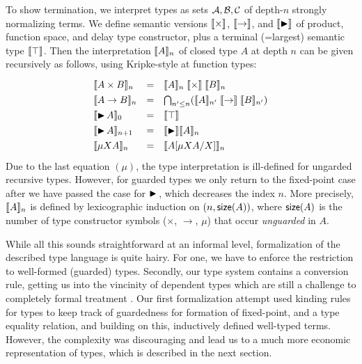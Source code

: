 To show termination, we interpret types as sets $\mathcal{A},\mathcal{B},\mathcal{C}$ of
depth-$n$ strongly normalizing terms. 
We define semantic versions $\mathrel{\llbracket \times \rrbracket}$,
$\mathrel{\llbracket \to \rrbracket}$, and $\mathop{\llbracket \mathord{\blacktriangleright} \rrbracket}$ of product, function space, and delay type
constructor, plus a terminal (=largest) semantic type $\mathop{\llbracket \top \rrbracket}$.  Then
the interpretation $\llbracket A \rrbracket_{n}$ of closed type $A$ at depth $n$ can be given
recursively as follows, using Kripke-style at function types:
\[
\def\arraystretch{1.3}
\begin{array}{lll}
  \Den{A \times B}n & = & \Den A n \semtimes \Den B n \\
  \Den{A \to B}n & = & \bigcap_{n' \leq n} (\Den A {n'} \semto \Den B
  {n'}) \\
  \Den{\later A}0 & = & \semtop \\
  \Den{\later A}{n+1} & = & \semlater \Den A n \\
  \Den{\mu X A}n & = & \Den{\subst{\mu X A}X A}n \\
\end{array}
\]
%
Due to the last equation $(\mu)$, the type interpretation is ill-defined for
ungarded recursive types.  However, for guarded types we only return
to the fixed-point case after we have passed the case for $\mathord{\blacktriangleright}\,$,
which decreases the index $n$.  More precisely, $\llbracket A \rrbracket_{n}$ is defined by
lexicographic induction on $(n, \mathsf{size}(A))$, where $\mathsf{size}(A)$ is the
number of type constructor symbols ($\times$, $\to$, $\mu$)
that occur \emph{unguarded} in $A$.

While all this sounds straightforward at an informal level, formalization
of the described type language is quite hairy.  For one, we have to
enforce the restriction to well-formed (guarded) types.  Secondly, our
type system contains a conversion rule, getting us into the vincinity
of dependent types which are still a challenge to completely formal
treatment \citep{mcBride:wgp10}.  Our first formalization attempt used
kinding rules for types to keep track of guardedness for formation of
fixed-point, and a type equality relation, and building on this,
inductively defined well-typed terms.  However, the complexity was
discouraging and lead us to a much more economic representation of
types, which is described in the next section.

